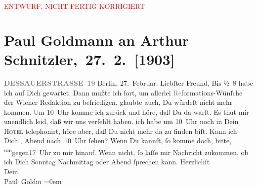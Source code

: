 
\begin{center}
            \textcolor{red}{ENTWURF, NICHT FERTIG KORRIGIERT}
                      \end{center}
            
         \renewcommand{\erwaehnteInstitutionen}{Institutionen: Neue Freie Presse, Palasthotel Berlin}
         \renewcommand{\erwaehnteOrte}{Orte: Berlin, Dessauer Straße, Wien}
         \renewcommand{\erwaehnteWerke}{}
               \section[ Paul Goldmann an Arthur Schnitzler, 27. 2. {[}1903{]}]{ Paul Goldmann an Arthur Schnitzler, 27. 2. {[}1903{]}}\nopagebreak{}\rehead{ }\begin{ledgroupsized}[t]{13cm}\normalsize\beginnumbering \toendnotes[C]{\smallbreak\pagebreak[2]} 
\toendnotes[C]{\smallbreak}\pstart
           \noindent{}\raggedleft{}{\pb}\textcolor{gray}{\textbf{DESSAUERSTRASSE 19}}\pend
           \pstart
           Berlin, 27. Februar.\pend
           \pstart\center{}Liebſter Freund,\pend\pstart
           Bis ½ 8 habe ich auf Dich gewartet. Dann mußte ich fort, um allerlei
                  \textcolor{gray}{Re}formations-Wünſche der Wiener Redaktion zu
               befriedigen, glaubte auch, Du würdeſt nicht mehr kommen. Um 10 Uhr komme
               ich zurück und höre, daß Du da {\pb}warſt. Es thut mir
               unendlich leid, daß wir uns verfehlt haben. ich habe um 10 Uhr noch in
               Dein \textsc{Hotel} telephonirt, höre aber, daß Du nicht mehr da zu finden biſt. Kann ich Dich
                  \label{K_L03365-1v}\label{K_L03365-1h}, Abend
                  nach 10 Uhr ſehen? Wenn Du kannſt, ſo komme doch, bitte, \substVorne{}\textsuperscript{um}\substDazwischen{}gegen\substHinten{}{ }17 Uhr zu mir hinauf. Wenn {\pb}nicht, ſo
               laſſe mir Nachricht zukommen, ob ich Dich Sonntag{ }Nachmittag oder Abend ſprechen kann.\pend
           \pstart
           Herzlichſt {\\[\baselineskip]}Dein {\\[\baselineskip]}\spacefill\mbox{Paul Goldm}\pend
           \leftskip=0em{}
         

\end{ledgroupsized}
